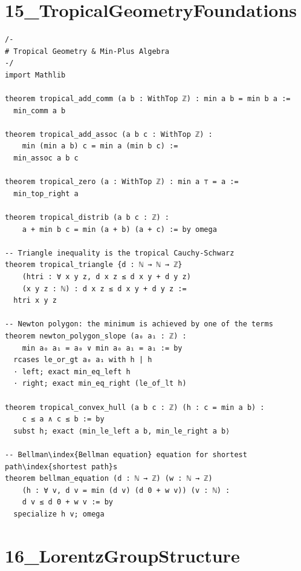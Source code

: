 \documentclass[11pt,openany]{book}
\theoremstyle{definition}
\theoremstyle{plain}
\theoremstyle{remark}
\begin{document}
\clearpage

\section*{15\_TropicalGeometryFoundations}

\begin{lstlisting}[style=lean]
/-
# Tropical Geometry & Min-Plus Algebra
-/
import Mathlib

theorem tropical_add_comm (a b : WithTop ℤ) : min a b = min b a :=
  min_comm a b

theorem tropical_add_assoc (a b c : WithTop ℤ) :
    min (min a b) c = min a (min b c) :=
  min_assoc a b c

theorem tropical_zero (a : WithTop ℤ) : min a ⊤ = a :=
  min_top_right a

theorem tropical_distrib (a b c : ℤ) :
    a + min b c = min (a + b) (a + c) := by omega

-- Triangle inequality is the tropical Cauchy-Schwarz
theorem tropical_triangle {d : ℕ → ℕ → ℤ}
    (htri : ∀ x y z, d x z ≤ d x y + d y z)
    (x y z : ℕ) : d x z ≤ d x y + d y z :=
  htri x y z

-- Newton polygon: the minimum is achieved by one of the terms
theorem newton_polygon_slope (a₀ a₁ : ℤ) :
    min a₀ a₁ = a₀ ∨ min a₀ a₁ = a₁ := by
  rcases le_or_gt a₀ a₁ with h | h
  · left; exact min_eq_left h
  · right; exact min_eq_right (le_of_lt h)

theorem tropical_convex_hull (a b c : ℤ) (h : c = min a b) :
    c ≤ a ∧ c ≤ b := by
  subst h; exact ⟨min_le_left a b, min_le_right a b⟩

-- Bellman\index{Bellman equation} equation for shortest path\index{shortest path}s
theorem bellman_equation (d : ℕ → ℤ) (w : ℕ → ℤ)
    (h : ∀ v, d v = min (d v) (d 0 + w v)) (v : ℕ) :
    d v ≤ d 0 + w v := by
  specialize h v; omega

\end{lstlisting}

\clearpage

\section*{16\_LorentzGroupStructure}
\end{document}
